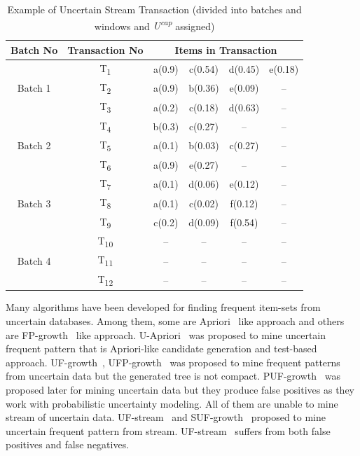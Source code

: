 \documentclass[conference]{IEEEtran}
\begin{document}
\begin{table}
\centering
\begin{tabular}{|c|c|c|c|c|c|}
\hline
	Batch No& Transaction No & \multicolumn{4}{c|}{Items in Transaction} \\ \hline \hline
	\multirow{3}{*}{Batch 1}	&	T\textsubscript{1} & a(0.9) & c(0.54) & d(0.45) & e(0.18)		\\
								&	T\textsubscript{2} & a(0.9) & b(0.36) & e(0.09) & --			\\
								&	T\textsubscript{3} & a(0.2) & c(0.18) & d(0.63) & --			\\\hline
	\multirow{3}{*}{Batch 2}	&	T\textsubscript{4} & b(0.3) & c(0.27) & --  	& --			\\
								&	T\textsubscript{5} & a(0.1) & b(0.03) & c(0.27) & --  			\\
								&	T\textsubscript{6} & a(0.9) & e(0.27) & --	    & --  			\\\hline
	\multirow{3}{*}{Batch 3}	&	T\textsubscript{7} & a(0.1) & d(0.06) & e(0.12) & --			\\
								&	T\textsubscript{8} & a(0.1) & c(0.02) & f(0.12) & --   			\\
								&	T\textsubscript{9} & c(0.2) & d(0.09) & f(0.54) & --   			\\\hline
								
	\multirow{3}{*}{Batch 4}	&	T\textsubscript{10} &  --  &  --  &  --  & --    				\\
								&	T\textsubscript{11} &  --  &  --  &  --  & --    				\\
								&	T\textsubscript{12} &  --  &  --  &  --  & --    				\\\hline
	\end{tabular}
\caption{Example of Uncertain Stream Transaction (divided into batches and windows and \emph{U\textsuperscript{cap}} assigned)}
\label{table:prefix_assigned}
\end{table}
Many algorithms have been developed for finding frequent item-sets from uncertain databases. Among them, some are Apriori~\cite{DBLP:conf/vldb/AgrawalS94} like approach and others are FP-growth~\cite{DBLP:journals/datamine/HanPYM04} like approach. U-Apriori~\cite{DBLP:journals/tkde/ZhaoYN14} was proposed to mine uncertain frequent pattern that is Apriori-like candidate generation and test-based approach. UF-growth~\cite{DBLP:conf/kdd/GadeWK04}, UFP-growth~\cite{DBLP:conf/kdd/AggarwalLWW09} was proposed to mine frequent patterns from uncertain data but the generated tree is not compact. PUF-growth~\cite{DBLP:conf/pakdd/LeungT13} was proposed later for mining uncertain data but they produce false positives as they work with probabilistic uncertainty modeling. All of them are unable to mine stream of uncertain data. UF-stream~\cite{DBLP:conf/icde/LeungH09} and SUF-growth~\cite{DBLP:conf/icde/LeungH09} proposed to mine uncertain frequent pattern from stream. UF-stream~\cite{DBLP:conf/icde/LeungH09} suffers from both false positives and false negatives. 
\end{document}
